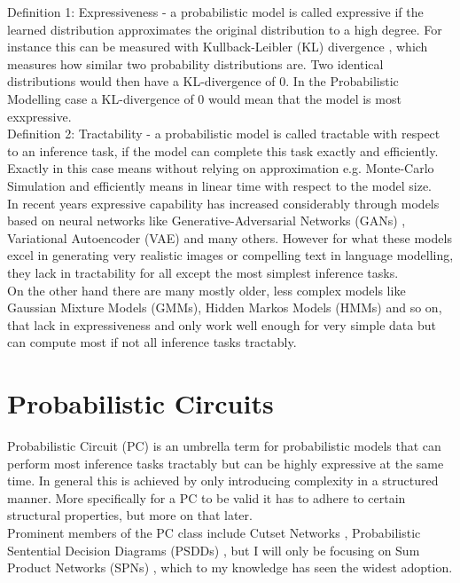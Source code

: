 Definition 1: Expressiveness - a probabilistic model is called expressive if the learned distribution approximates the original distribution to a high degree.
For instance this can be measured with Kullback-Leibler (KL) divergence \cite{kl_divergence}, which measures how similar two probability distributions are. 
Two identical distributions would then have a KL-divergence of $0$. In the Probabilistic Modelling case a KL-divergence of 0 would mean that the model is most exxpressive. \\

Definition 2: Tractability - a probabilistic model is called tractable with respect to an inference task, if the model can complete this 
task exactly and efficiently. Exactly in this case means without relying on approximation e.g. Monte-Carlo Simulation and efficiently 
means in linear time with respect to the model size. \\

In recent years expressive capability has increased considerably through models based on neural networks like Generative-Adversarial
Networks (GANs) \cite{gan}, Variational Autoencoder (VAE) \cite{vae} and many others. However for what these models excel in generating 
very realistic images or compelling text in language modelling, they lack in tractability for all except the most simplest inference tasks. 
\cite{pc_intro} \\

On the other hand there are many mostly older, less complex models like Gaussian Mixture Models (GMMs), Hidden Markos Models (HMMs) and so on, 
that lack in expressiveness and only work well enough for very simple data but can compute most if not all inference tasks tractably.

\section{Probabilistic Circuits}
\label{sec:pc}

Probabilistic Circuit (PC) is an umbrella term for probabilistic models that can perform most inference tasks tractably but can be 
highly expressive at the same time. In general this is achieved by only introducing complexity in a structured manner. More specifically
for a PC to be valid it has to adhere to certain structural properties, but more on that later. \\

Prominent members of the PC class include Cutset Networks \cite{cutset}, Probabilistic
Sentential Decision Diagrams (PSDDs) \cite{psdd}, but I will only be focusing on Sum Product Networks (SPNs) \cite{spn}, which to my 
knowledge has seen the widest adoption. 

